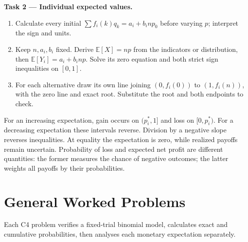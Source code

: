 \textbf{Task 2 --- Individual expected values.}
\begin{enumerate}
\item Calculate every initial $\sum f_i(k)q_k=a_i+b_inp_0$ before varying $p$; interpret the sign and units.
\item Keep $n,a_i,b_i$ fixed. Derive $\mathbb E[X]=np$ from the indicators or distribution, then $\mathbb E[Y_i]=a_i+b_inp$. Solve its zero equation and both strict sign inequalities on $[0,1]$.
\item For each alternative draw its own line joining $(0,f_i(0))$ to $(1,f_i(n))$, with the zero line and exact root. Substitute the root and both endpoints to check.
\end{enumerate}
For an increasing expectation, gain occurs on $(p_i^*,1]$ and loss on $[0,p_i^*)$.
For a decreasing expectation these intervals reverse. Division by a negative slope reverses inequalities.
At equality the expectation is zero, while realized payoffs remain uncertain.
Probability of loss and expected net profit are different quantities: the former measures the chance of negative outcomes; the latter weights all payoffs by their probabilities.
\clearpage\section{General Worked Problems}\label{sec:t2-c4-general}\label{sec:t2-c4-foundational}\label{sec:t2-c4-intermediate}
Each C4 problem verifies a fixed-trial binomial model, calculates exact and cumulative probabilities, then analyses each monetary expectation separately.
